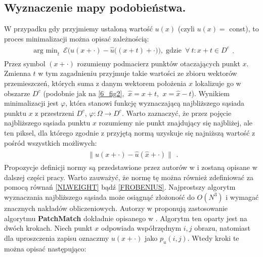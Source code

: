 \documentclass[12pt, twoside, openany]{report}
\theoremstyle{definition}
\begin{document}
\subsection{Wyznaczenie mapy podobieństwa.}
\label{ssec:wyznaczanieMapySection}
W przypadku gdy przyjmiemy ustaloną wartość $u(x)$ (czyli $u(x) = $ const), to proces minimalizacji można opisać zależnością:
\begin{align}
\begin{aligned}
\mathop{\operatorname{arg \ min}}_{t} \ \mathcal{E}\biggl( u(x+\cdot) - {\hat{u}}\bigl((x+t)+\cdot\bigr)\biggr),\operatorname{gdzie} \ \forall \ t : x+t \in D^c
\label{minNNF}
\end{aligned}
.
\end{align}
Przez symbol $(x+\cdot)$ rozumiemy podmacierz punktów otaczających punkt $x$. 
Zmienna $t$ w tym zagadnieniu przyjmuje takie wartości ze zbioru wektorów przemieszczeń, których suma z danym wektorem położenia $x$ lokalizuje go w obszarze $D^c$ (podobnie jak na \autoref{6_fig2}, $ \ \hat{x} = x + t$, $ \ x = \hat{x} - t$). Wynikiem minimalizacji jest $\varphi$, która stanowi funkcję wyznaczającą najbliższego sąsiada punktu $x$ z przestrzeni $D^c$, $\varphi :\Omega \rightarrow D^c$. Warto zaznaczyć, że przez pojęcie najbliższego sąsiada punktu $x$ rozumiemy nie punkt znajdujący się najbliżej, ale ten piksel, dla którego zgodnie z przyjętą normą uzyskuje się najniższą wartość z pośród wszystkich możliwych:
\begin{align}
\begin{aligned}
\big\| u(x + \cdot) - \hat{u}(\hat{x}+\cdot) \big\| 
\label{normNNF}
\end{aligned}
.
\end{align}
Propozycje definicji normy są przedstawione przez autorów w \cite{MathematicalModelsforNLTextureInpainting} i zostaną opisane w dalszej części pracy. Warto zauważyć, że normę tę można również zdefiniować za pomocą równań \eqref{NLWEIGHT} bądź \eqref{FROBENIUS}. Najprostszy algorytm wyznaczania najbliższego sąsiada może osiągnąć złożoność do $O(N^3)$ i wymagać znacznych nakładów obliczeniowych. Autorzy w \cite{arias2011variational} proponują zastosowanie algorytmu \textbf{PatchMatch} dokładnie opisanego w \cite{barnes2009patchmatch}. Algorytm ten oparty jest na dwóch krokach. Niech punkt $x$ odpowiada współrzędnym $i, j$ obrazu, natomiast dla uproszczenia zapisu oznaczmy $u(x+\cdot)$ jako $p_u(i,j)$. Wtedy kroki te można opisać następująco:
\end{document}
